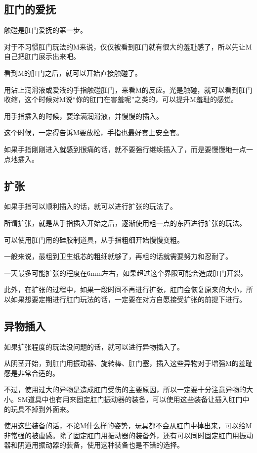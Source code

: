 \documentclass[12pt,UTF8]{ctexbook}
\begin{document}
\subsection{肛门的爱抚}

触碰是肛门爱抚的第一步。

对于不习惯肛门玩法的M来说，仅仅被看到肛门就有很大的羞耻感了，所以先让M自己把肛门展示出来吧。

看到M的肛门之后，就可以开始直接触碰了。

用沾上润滑液或爱液的手指触碰肛门，来看M的反应。光是触碰，就可以看到肛门收缩，这个时候对M说“你的肛门在害羞呢”之类的，可以提升M羞耻的感觉。

用手指插入的时候，要涂满润滑液，并慢慢的插入。

这个时候，一定得告诉M要放松，手指也最好套上安全套。

如果手指刚刚进入就感到很痛的话，就不要强行继续插入了，而是要慢慢地一点一点地插入。

\subsection{扩张}

如果手指可以顺利插入的话，就可以进行扩张的玩法了。

所谓扩张，就是从手指插入开始之后，逐渐使用粗一点的东西进行扩张的玩法。

可以使用肛门用的硅胶制道具，从手指粗细开始慢慢变粗。

一般来说，最粗到卫生纸芯的粗细就够了，再粗的话就需要努力和忍耐了。

一天最多可能扩张的程度在6mm左右，如果超过这个界限可能会造成肛门开裂。

此外，在扩张的过程中，如果一段时间不再进行扩张，肛门会恢复原来的大小，所以如果想要定期进行肛门玩法的话，一定要在对方自愿接受扩张的前提下进行。

\subsection{异物插入}

如果扩张程度的玩法没问题的话，就可以进行异物插入了。

从阴茎开始，到肛门用振动器、旋转棒、肛门塞，插入这些异物对于增强M的羞耻感是非常合适的。

不过，使用过大的异物是造成肛门受伤的主要原因，所以一定要十分注意异物的大小。SM道具中也有用来固定肛门振动器的装备，可以使用这些装备让插入肛门中的玩具不掉到外面来。

使用这些装备的话，不论M什么样的姿势，玩具都不会从肛门中掉出来，可以给M非常强的被虐感。除了固定肛门用振动器的装备外，还有可以同时固定肛门用振动器和阴道用振动器的装备，使用这种装备也是不错的选择。
\end{document}
